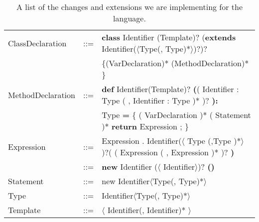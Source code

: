\begin{table}[h]
  \caption{A list of the changes and extensions we are implementing for the language.}
  \begin{tabular}{ l  c  l}
    \hline
    ClassDeclaration & ::= & \textbf{class} Identifier (Template)?
    (\textbf{extends} Identifier($\langle$Type(, Type)*$\rangle$)?)?  \\
    && \{(VarDeclaration)* (MethodDeclaration)* \}  \\
    \hline
    MethodDeclaration & ::= & \textbf{def} Identifier(Template)?
    \textbf{(}( Identifier : Type ( , Identifier : Type )* )? \textbf{):}\\
    &&Type \textbf{=}
    \{ ( VarDeclaration )* ( Statement )*
    \textbf{return} Expression ; \}\\
    \hline
    Expression & ::= &  Expression . Identifier($\langle$ Type (,Type )*$\rangle$ )?( ( Expression ( , Expression )* )? \textbf{)} \\
    & ::= & \textbf{new} Identifier ($\langle$ Identifier$\rangle$)? \textbf{()} \\
    \hline
    Statement & ::= & new Identifier$\langle$Type(, Type)*$\rangle$ \\
    \hline
    Type & ::= & Identifier$\langle$Type(, Type)*$\rangle$ \\
    \hline
    Template & ::= & $\langle$ Identifier(, Identifier)* $\rangle$ \\
    \hline
  \end{tabular}
\end{table}
